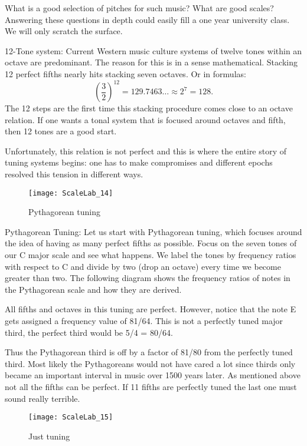 What is a good selection of pitches for such music? What are good scales? Answering these questions in depth could easily fill a one year university class. We will only scratch the surface.


12-Tone system: Current Western music culture systems of twelve tones within an octave are predominant. The reason for this is in a sense mathematical. Stacking 12 perfect fifths nearly hits stacking seven octaves. Or in formulas:
$$\left( \frac{3}{2}\right)^{12} = 129.7463 \ldots \approx 2^7 = 128 .$$
The 12 steps are the first time this stacking procedure comes close to an octave relation. If one wants a tonal system that is focused around octaves and fifth, then 12 tones are a good start.

Unfortunately, this relation is not perfect and this is where the entire story of tuning systems begins: one has to make compromises and different epochs resolved this tension in different ways.

\begin{figure}[h]
\centering
\texttt{[image: ScaleLab\_14]}
\caption*{Pythagorean tuning}
\end{figure}


Pythagorean Tuning: Let us start with Pythagorean tuning, which focuses around the idea of having as many perfect fifths as possible. Focus on the seven tones of our C major scale and see what happens. We label the tones by frequency ratios with respect to C and divide by two (drop an octave) every time we become greater than two. The following diagram shows the frequency ratios of notes in the Pythagorean scale and how they are derived.

All fifths and octaves in this tuning are perfect. However, notice that the note E gets assigned a frequency value of 81/64. This is not a perfectly tuned major third, the perfect third would be 5/4 = 80/64.

Thus the Pythagorean third is off by a factor of 81/80 from the perfectly tuned third. Most likely the Pythagoreans would not have cared a lot since thirds only became an important interval in music over 1500 years later. As mentioned above not all the fifths can be perfect. If 11 fifths are perfectly tuned the last one must sound really terrible.

\begin{figure}[h]
\centering
\texttt{[image: ScaleLab\_15]}
\caption*{Just tuning}
\end{figure}

